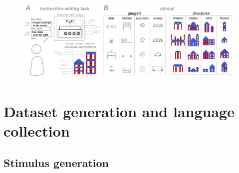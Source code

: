 \documentclass[10pt,letterpaper]{article}
\begin{document}
\begin{figure}
  \begin{center}
  \includegraphics[width=0.99\linewidth]{figures/task_fig_full.pdf}
  \caption{}
  \label{fig:task}
  \end{center}
  \end{figure}    

\section{Dataset generation and language collection} \label{sec-dataset}


\subsection{Stimulus generation} %



\end{document}
